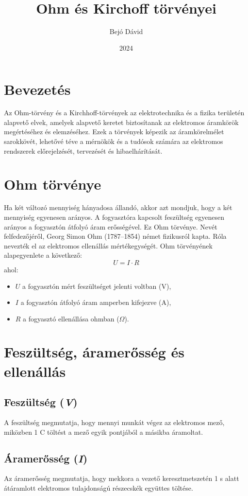 \documentclass{article}
\title{Ohm és Kirchoff törvényei}
\author{Bejó Dávid}
\date{2024}
\begin{document}
\maketitle

\section{Bevezetés}
Az Ohm-törvény és a Kirchhoff-törvények az elektrotechnika és a fizika területén alapvető elvek, amelyek alapvető keretet biztosítanak az elektromos áramkörök megértéséhez és elemzéséhez. Ezek a törvények képezik az áramkörelmélet sarokkövét, lehetővé téve a mérnökök és a tudósok számára az elektromos rendszerek előrejelzését, tervezését és hibaelhárítását.

\section{Ohm törvénye}
Ha két változó mennyiség hányadosa állandó, akkor azt mondjuk, hogy a két mennyiség egyenesen arányos. A fogyasztóra kapcsolt feszültség egyenesen arányos a fogyasztón átfolyó áram erősségével. Ez Ohm törvénye. Nevét felfedezőjéről, Georg Simon Ohm (1787–1854) német fizikusról kapta. Róla nevezték el az elektromos ellenállás mértékegységét. Ohm törvényének alapegyenlete a következő:
\begin{equation}
    U = I \cdot R
\end{equation}
ahol:
\begin{itemize}
    \item $U$ a fogyasztón mért feszültséget jelenti voltban (V),
    \item $I$ a fogyasztón átfolyó áram amperben kifejezve (A),
    \item $R$ a fogyasztó ellenállása ohmban ($\Omega$).
\end{itemize}

\section{Feszültség, áramerősség és ellenállás}
\subsection{Feszültség (\textit{V})}
A feszültség megmutatja, hogy mennyi munkát végez az elektromos mező, miközben 1 C töltést a mező egyik pontjából a másikba áramoltat.

\subsection{Áramerősség (\textit{I})}
Az áramerősség megmutatja, hogy mekkora a vezető keresztmetszetén 1 s alatt átáramlott elektromos tulajdonságú részecskék együttes töltése.
\end{document}
